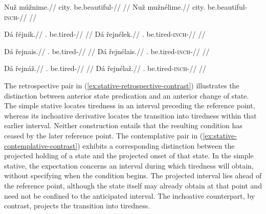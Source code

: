 \pex[splitpartspenalty=10000]\label{ex:stative-progressive-contrast}
\a
\begingl
\gla *Nuž múžnime.//
\glb city.\Dir{} be.beautiful-\Prog{}//
\glft {}
//
\endgl
\a
\begingl
\gla Nuž mužnélime.//
\glb city.\Dir{} be.beautiful-\textsc{inch}-\Prog{}//
\glft {}
//
\endgl
\xe

\pex\label{ex:stative-perfective-contrast}
\a
\begingl
\gla *Dá řéjnik.//
\Sg{}.\Dir{} be.tired-\Pf{}//
\glft {}
//
\endgl
\a
\begingl
\gla Dá řejnélek.//
\Sg{}.\Dir{} be.tired-\textsc{inch}-\Pf{}//
\glft {}
//
\endgl
\xe

\pex\label{ex:stative-retrospective-contrast}
\a
\begingl
\gla Dá řejnais.//
\Sg{}.\Dir{} be.tired-\Ret{}//
\glft {}
//
\endgl
\a
\begingl
\gla Dá řejnélais.//
\Sg{}.\Dir{} be.tired-\textsc{inch}-\Ret{}//
\glft {}
//
\endgl
\xe

\pex\label{ex:stative-contemplative-contrast}
\a
\begingl
\gla Dá řejnáž.//
\Sg{}.\Dir{} be.tired-\Ctpl{}//
\glft {}
//
\endgl
\a
\begingl
\gla Dá řejnélaž.//
\Sg{}.\Dir{} be.tired-\textsc{inch}-\Ctpl{}//
\glft {}
//
\endgl
\xe

The retrospective pair in (\ref{ex:stative-retrospective-contrast})
illustrates the distinction between anterior state predication and an
anterior change of state. The simple stative locates tiredness in an
interval preceding the reference point, whereas its inchoative derivative
locates the transition into tiredness within that earlier interval. Neither
construction entails that the resulting condition has ceased by the later
reference point. The contemplative pair in
(\ref{ex:stative-contemplative-contrast}) exhibits a corresponding
distinction between the projected holding of a state and the projected
onset of that state. In the simple stative, the expectation concerns an
interval during which tiredness will obtain, without specifying when the
condition begins. The projected interval lies ahead of the reference point,
although the state itself may already obtain at that point and need not be
confined to the anticipated interval. The inchoative counterpart, by
contrast, projects the transition into tiredness.

